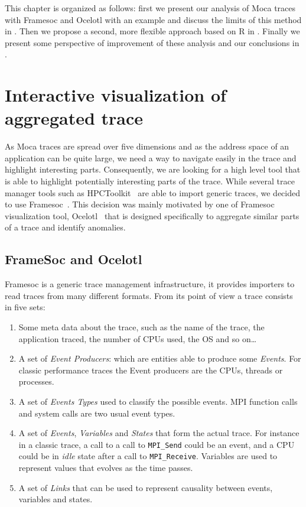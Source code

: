 This chapter is organized as follows: first we present our analysis of \gls{Moca} traces with \gls{Framesoc} and \gls{Ocelotl} with an example and discuss the limits of this method in .
Then we propose a second, more flexible approach based on \gls{R} in .
Finally we present some perspective of improvement of these analysis and our conclusions in .


\section{Interactive visualization of aggregated trace}
\label{sec:visu-first}

As \gls{Moca} traces are spread over five dimensions and as the address space of an application can be quite large, we need a way to navigate easily in the trace and highlight interesting parts.
Consequently, we are looking for a high level tool that is able to highlight potentially interesting parts of the trace.
While several trace manager tools such as \gls{HPCToolkit}~\cite{Adhianto10HPCTOOLKIT} are able to import generic traces, we decided to use \gls{Framesoc}~\cite{Pagano14frameSoC}.
This decision was mainly motivated by one of \gls{Framesoc} visualization tool, \gls{Ocelotl}~\cite{Dosimont14Ocelotl} that is designed specifically to aggregate similar parts of a trace and identify anomalies.

\subsection{FrameSoc and Ocelotl}

\gls{Framesoc} is a generic trace management infrastructure, it provides importers to read traces from many different formats.
From its point of view a trace consists in five sets:
\begin{enumerate}
    \item Some meta data about the trace, such as the name of the trace, the application traced, the number of \glspl{CPU} used, the \gls{OS} and so on\ldots
    \item A set of \emph{Event Producers}: which are entities able to produce some \emph{Events}.
        For classic performance traces the Event producers are the \glspl{CPU}, threads or processes.
    \item A set of \emph{Events Types} used to classify the possible events.
        \gls{MPI} function calls and system calls are two usual event types.
    \item A set of \emph{Events}, \emph{Variables} and \emph{States} that form the actual trace.
        For instance in a classic trace, a call to a call to \texttt{MPI\_Send} could be an event, and a \gls{CPU} could be in \emph{idle} state after a call to \texttt{MPI\_Receive}.
        Variables are used to represent values that evolves as the time passes.
    \item A set of \emph{Links} that can be used to represent causality between events, variables and states.
\end{enumerate}

